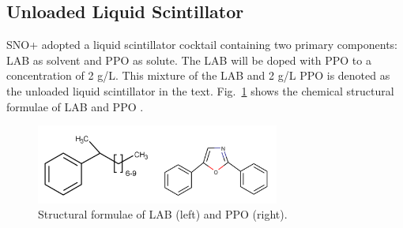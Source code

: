 \subsection{Unloaded Liquid Scintillator}\label{sect:LS_SNO+}

SNO+ adopted a liquid scintillator cocktail containing two primary components: LAB as solvent and PPO as solute. The LAB will be doped with PPO to a concentration of 2 g/L. This mixture of the LAB and 2 g/L PPO is denoted as the unloaded liquid scintillator in the text. Fig.~\ref{labppo-molecule} shows the chemical structural formulae of LAB and PPO \cite{collaboration2020development}.
\begin{figure}[!htb]
	\centering
	\includegraphics[width=8cm]{lab-ppo-molecule.png}
	\caption[Structural formulae of LAB and PPO.]{Structural formulae of LAB (left) and PPO (right).}
	\label{labppo-molecule}
\end{figure}

